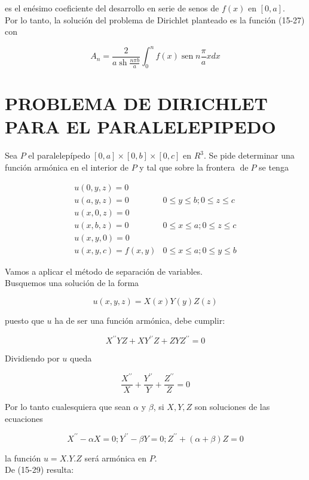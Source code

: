 \documentclass[10pt]{article}
\theoremstyle{plain}
\theoremstyle{definition}
\theoremstyle{remark}
\begin{document}
es el enésimo coeficiente del desarrollo en serie de senos de $f(x)$ en $[0, a]$.\\
Por lo tanto, la solución del problema de Dirichlet planteado es la función (15-27) con

$$
A_{n}=\frac{2}{a \operatorname{sh} \frac{n \pi b}{a}} \int_{0}^{n} f(x) \operatorname{sen} n \frac{\pi}{a} x d x
$$

\section*{PROBLEMA DE DIRICHLET PARA EL PARALELEPIPEDO}
Sea $P$ el paralelepípedo $[0, a] \times[0, b] \times[0, c]$ en $R^{3}$. Se pide determinar una función armónica en el interior de $P$ y tal que sobre la frontera $\operatorname{de} P$ se tenga

\[
\begin{array}{ll}
u(0, y, z)=0 & \\
u(a, y, z)=0 & 0 \leqslant y \leqslant b ; 0 \leqslant z \leqslant c \\
u(x, 0, z)=0 & \\
u(x, b, z)=0 & 0 \leqslant x \leqslant a ; 0 \leqslant z \leqslant c \\
u(x, y, 0)=0 & \\
u(x, y, c)=f(x, y) & 0 \leqslant x \leqslant a ; 0 \leqslant y \leqslant b \tag{15-29}
\end{array}
\]

Vamos a aplicar el método de separación de variables.\\
Busquemos una solución de la forma

$$
u(x, y, z)=X(x) Y(y) Z(z)
$$

puesto que $u$ ha de ser una función armónica, debe cumplir:

$$
X^{\prime \prime} Y Z+X Y^{\prime \prime} Z+Z Y Z^{\prime \prime}=0
$$

Dividiendo por $u$ queda

$$
\frac{X^{\prime \prime}}{X}+\frac{Y^{\prime \prime}}{Y}+\frac{Z^{\prime \prime}}{Z}=0
$$

Por lo tanto cualesquiera que sean $\alpha$ y $\beta$, si $X, Y, Z$ son soluciones de las ecuaciones

$$
X^{\prime \prime}-\alpha X=0 ; Y^{\prime \prime}-\beta Y=0 ; Z^{\prime \prime}+(\alpha+\beta) Z=0
$$

la función $u=X . Y . Z$ será armónica en $P$.\\
De (15-29) resulta:
\end{document}
